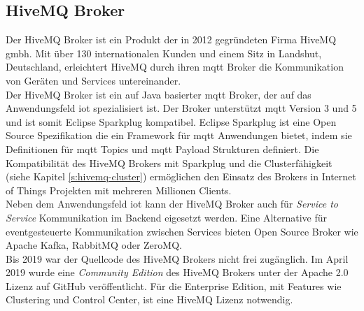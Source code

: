 \newpage

\subsection{HiveMQ Broker} \label{s:hivemq-broker}
Der HiveMQ Broker ist ein Produkt der in 2012 gegründeten Firma HiveMQ \acs{gmbh}. Mit über 130 internationalen Kunden und einem Sitz in Landshut, Deutschland, erleichtert HiveMQ durch ihren \ac{mqtt} Broker die Kommunikation von Geräten und Services untereinander.
\cite{HiveMQCompanya}
\\
Der HiveMQ Broker ist ein auf Java basierter \ac{mqtt} Broker, der auf das Anwendungsfeld \acl{iot} spezialisiert ist. Der Broker unterstützt \ac{mqtt} Version 3 und 5 und ist somit Eclipse Sparkplug kompatibel.
Eclipse Sparkplug ist eine Open Source Spezifikation die ein Framework für \ac{mqtt} Anwendungen bietet, indem sie Definitionen für \ac{mqtt} Topics und \ac{mqtt} Payload Strukturen definiert.
Die Kompatibilität des HiveMQ Brokers mit Sparkplug und die Clusterfähigkeit (siehe Kapitel \ref{s:hivemq-cluster}) ermöglichen den Einsatz des Brokers in Internet of Things Projekten mit mehreren Millionen Clients.
\cite{obermaierMQTTSparkplugEssentials}
\\
Neben dem Anwendungsfeld \ac{iot} kann der HiveMQ Broker auch für \textit{Service to Service} Kommunikation im Backend eigesetzt werden.
Eine Alternative für eventgesteuerte Kommunikation zwischen Services bieten Open Source Broker wie Apache Kafka, RabbitMQ oder ZeroMQ.
\\
Bis 2019 war der Quellcode des HiveMQ Brokers nicht frei zugänglich. Im April 2019 wurde eine \textit{Community Edition} des HiveMQ Brokers unter der Apache 2.0 Lizenz auf GitHub veröffentlicht. Für die Enterprise Edition, mit Features wie Clustering und Control Center, ist eine HiveMQ Lizenz notwendig.

